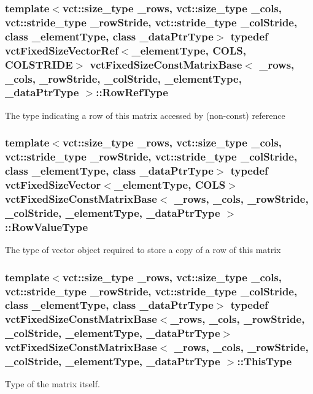 \subsubsection[{Row\+Ref\+Type}]{\setlength{\rightskip}{0pt plus 5cm}template$<$vct\+::size\+\_\+type \+\_\+rows, vct\+::size\+\_\+type \+\_\+cols, vct\+::stride\+\_\+type \+\_\+row\+Stride, vct\+::stride\+\_\+type \+\_\+col\+Stride, class \+\_\+element\+Type, class \+\_\+data\+Ptr\+Type$>$ typedef {\bf vct\+Fixed\+Size\+Vector\+Ref}$<$\+\_\+element\+Type, {\bf C\+O\+L\+S}, {\bf C\+O\+L\+S\+T\+R\+I\+D\+E}$>$ {\bf vct\+Fixed\+Size\+Const\+Matrix\+Base}$<$ \+\_\+rows, \+\_\+cols, \+\_\+row\+Stride, \+\_\+col\+Stride, \+\_\+element\+Type, \+\_\+data\+Ptr\+Type $>$\+::{\bf Row\+Ref\+Type}}\label{classvct_fixed_size_const_matrix_base_a2ce1bc7d955f66d28462cb34b62d69b7}
The type indicating a row of this matrix accessed by (non-\/const) reference \hypertarget{classvct_fixed_size_const_matrix_base_a085661aab062c6d975e558be1cfae2d7}{}
\subsubsection[{Row\+Value\+Type}]{\setlength{\rightskip}{0pt plus 5cm}template$<$vct\+::size\+\_\+type \+\_\+rows, vct\+::size\+\_\+type \+\_\+cols, vct\+::stride\+\_\+type \+\_\+row\+Stride, vct\+::stride\+\_\+type \+\_\+col\+Stride, class \+\_\+element\+Type, class \+\_\+data\+Ptr\+Type$>$ typedef {\bf vct\+Fixed\+Size\+Vector}$<$\+\_\+element\+Type, {\bf C\+O\+L\+S}$>$ {\bf vct\+Fixed\+Size\+Const\+Matrix\+Base}$<$ \+\_\+rows, \+\_\+cols, \+\_\+row\+Stride, \+\_\+col\+Stride, \+\_\+element\+Type, \+\_\+data\+Ptr\+Type $>$\+::{\bf Row\+Value\+Type}}\label{classvct_fixed_size_const_matrix_base_a085661aab062c6d975e558be1cfae2d7}
The type of vector object required to store a copy of a row of this matrix \hypertarget{classvct_fixed_size_const_matrix_base_a7ec66a96ed7e08ce9ff54093133c9d8d}{}
\subsubsection[{This\+Type}]{\setlength{\rightskip}{0pt plus 5cm}template$<$vct\+::size\+\_\+type \+\_\+rows, vct\+::size\+\_\+type \+\_\+cols, vct\+::stride\+\_\+type \+\_\+row\+Stride, vct\+::stride\+\_\+type \+\_\+col\+Stride, class \+\_\+element\+Type, class \+\_\+data\+Ptr\+Type$>$ typedef {\bf vct\+Fixed\+Size\+Const\+Matrix\+Base}$<$\+\_\+rows, \+\_\+cols, \+\_\+row\+Stride, \+\_\+col\+Stride, \+\_\+element\+Type, \+\_\+data\+Ptr\+Type$>$ {\bf vct\+Fixed\+Size\+Const\+Matrix\+Base}$<$ \+\_\+rows, \+\_\+cols, \+\_\+row\+Stride, \+\_\+col\+Stride, \+\_\+element\+Type, \+\_\+data\+Ptr\+Type $>$\+::{\bf This\+Type}}\label{classvct_fixed_size_const_matrix_base_a7ec66a96ed7e08ce9ff54093133c9d8d}
Type of the matrix itself. 

